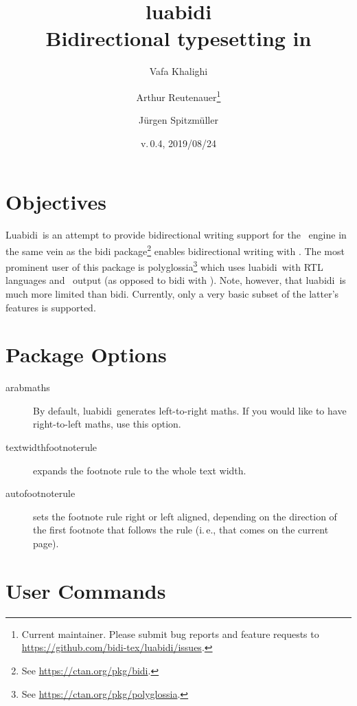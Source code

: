 \documentclass{article}
\newcommand*\lbd{\textsf{luabidi}}
\newcommand*\Lbd{\textsf{Luabidi}}
\def\fileversion{0.4}
\def\filedate{2019/08/24}
\begin{document}
	
\title{\lbd\\Bidirectional typesetting in \LuaTeX}

\date{v.\,\fileversion, \filedate}

\author{Vafa Khalighi \and Arthur Reutenauer\thanks{%
		Current maintainer. Please submit bug reports and feature requests to \protect\url{https://github.com/bidi-tex/luabidi/issues}.}
	    \and Jürgen Spitzmüller}

\maketitle

\section{Objectives}
\Lbd\ is an attempt to provide bidirectional writing support for the \LuaTeX\ engine in the same vein as the \textsf{bidi} package\footnote{%
See \url{https://ctan.org/pkg/bidi}.} enables bidirectional writing with \XeTeX. The most prominent user of this package is \textsf{polyglossia}\footnote{%
See \url{https://ctan.org/pkg/polyglossia}.} which uses \lbd\ with RTL languages and \LuaTeX\ output (as opposed to \textsf{bidi} with \XeTeX). Note, however, that \lbd\ is much more limited than \textsf{bidi}. Currently, only a very basic
subset of the latter's features is supported.

\section{Package Options}

\begin{description}
	\item[arabmaths] By default, \lbd\ generates left-to-right maths. If you would like to have right-to-left maths, use this option.
	\item[textwidthfootnoterule] expands the footnote rule to the whole text width.
	\item[autofootnoterule] sets the footnote rule right or left aligned, depending on the direction of the first footnote
	that follows the rule (i.\,e., that comes on the current page).
\end{description}

\section{User Commands}
\end{document}
